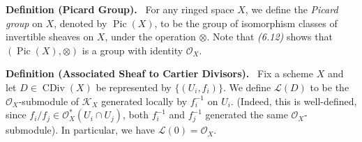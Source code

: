 \documentclass[11pt,a4paper,footinclude=true,headinclude=true]{scrbook} %
\DeclareMathOperator{\CDiv}{CDiv}
\DeclareMathOperator{\Pic}{Pic}
\newcommand{\KK}{\mathscr{K}}
\newcommand{\LL}{\mathscr{L}}
\newcommand{\OO}{\mathcal{O}}
\newcommand{\<}{\langle}
\newcommand{\>}{\rangle}
\newenvironment{definition}[2][Definition]
    { \begin{mdframed}[backgroundcolor=gray!20] \textbf{#1 #2.}\ }
    {  \end{mdframed}}
\begin{document}
\begin{definition}{(Picard Group)}\newline
    For any ringed space $X$, we define the \textit{Picard group} on $X$, denoted by $\Pic(X)$, to be the group of isomorphism classes of invertible sheaves on $X$, under the operation $\otimes$. Note that \textit{(6.12)} shows that $(\Pic(X),\otimes)$ is a group with identity $\OO_X$.
\end{definition}

\begin{definition}{(Associated Sheaf to Cartier Divisors)}
    \newline Fix a scheme $X$ and let $D\in\CDiv(X)$ be represented by $\{(U_i,f_i)\}$. We define $\LL(D)$ to be the $\OO_X$-submodule of $\KK_X$ generated locally by $f_i^{-1}$ on $U_i$. (Indeed, this is well-defined, since $f_i/f_j\in\OO_X^\ast(U_i\cap U_j)$, both $f_i^{-1}$ and $f_j^{-1}$ generated the same $\OO_X$-submodule). In particular, we have $\LL(0)=\OO_X$.
\end{definition}
\end{document}
